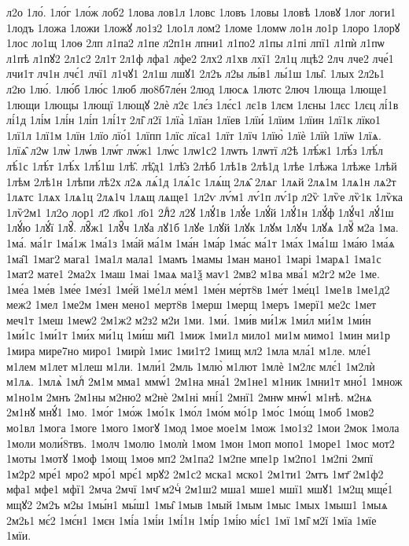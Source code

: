 {л2о
1ло́.
1ло́г
1ло́ж
лоб2
1лова
лов1л
1ловс
1ловъ
1ловы
1ловѣ
1ловꙋ
1лог
логи1
1лодъ
1ложа
1ложи
1ложꙋ
ло1з2
1ло1л
лом2
1ломе
1ломѡ
ло1н
ло1р
1лоро
1лорꙋ
1лос
ло1щ
1лоѳ
2лп
л1па2
л1пе
л2п1н
лпни1
л1по2
л1пы
л1пі
лпї1
л1пѝ
л1пѡ
л1пѣ
л1пꙋ2
2л1с2
2л1т
2л1ф
лфа1
лфе2
2лх2
л1хв
лхї1
2л1ц
лцѣ2
2лч
лче2
лче́1
лчи1т
лч1н
лчє́1
лчї1
л1чꙋ1
2л1ш
лшꙋ1
2л2ъ
л2ы
лы́в1
лы́1ш
1лы̑.
1лых
2л2ь1
л2ю
1лю́.
1лю́б
1лю́с
1люб
лю8б7ле́н
2люд
1люсѧ
1лютс
2люч
1люща
1люще1
1лющи
1лющы
1лющї
1лющꙋ
2лѐ
л2є
1лє́з
1лє́с1
лє1в
1лєм
1лєны
1лєс
1лєц
лі́1в
лі́1д
1лі́м
1лі́н
1лі́п
1лі́1т
2лі̑
л2ї
1лїа̀
1лїан
1лїев
1лїи́
1лїим
1лїин
1лї1к
лїко1
1лї1л
1лї1м
1лїн
1лїо
лїо́1
1лїпп
1лїс
лїса1
1лїт
1лїч
1лїю̀
1лїѐ
1лїѝ
1лїѡ
1лїѧ.
1лїѧ̑
л2ѡ
1лѡ̀
1лѡ́в
1лѡ́г
лѡ́ж1
1лѡ́с
1лѡ1с2
1лѡть
1лѡтї
л2ѣ
1лѣ́ж1
1лѣ́з
1лѣ́л
лѣ́1с
1лѣ́т
1лѣ́х
1лѣ́1ш
1лѣ̑.
лѣ̑д1
1лѣ̑з
2лѣб
1лѣ1в
2лѣ1д
1лѣе
1лѣжа
1лѣже
1лѣй
1лѣм
2лѣ1н
1лѣпи
лѣ2х
л2ѧ
лѧ́1д
1лѧ́1с
1лѧ́щ
2лѧ̑
2лѧг
1лѧй
2лѧ1м
1лѧ1н
лѧ2т
1лѧтс
1лѧх
1лѧ1ц
2лѧ1ч
1лѧщ
лѧще1
1л2ѵ
лѵ́м1
лѵ́1п
лѵ́1р
л2ѷ
1лѷе
лѷ1к
1лѷка
1лѷ2м1
1л2ѻ
лѻр1
л҃2
л҃ко1
л҃о1
2лⷣ2
л2ꙋ
1лꙋ́1в
1лꙋ́е
1лꙋ́й
1лꙋ́1н
1лꙋ́ф
1лꙋ́ч1
лꙋ́1ш
1лꙋ́ю
1лꙋ́ї
1лꙋ̑.
лꙋ̑ж1
1лꙋ̑ч
1лꙋа
лꙋ1б
1лꙋе
1лꙋй
1лꙋк
1лꙋм
1лꙋч
1лꙋѧ
1лꙋⷩ
м2а
1ма.
1ма́.
ма́1г
1ма́1ж
1ма́1з
1ма́й
ма́1м
1ма́н
1ма́р
1ма́с
ма́1т
1ма́х
1ма́1ш
1ма́ю
1ма́ѧ
1ма̑1
1маг2
мага1
1ма1л
мала1
1мамъ
1мамы
1ман
мано1
1марі
1марѧ1
1ма1с
1мат2
мате1
2ма2х
1маш
1маі
1маѧ
ма1ѯ
маѵ1
2мв2
м1ва
мва́1
м2г2
м2е
1ме.
1ме́а
1ме́в
1ме́е
1ме́з1
1ме́й
1ме́1л
ме́м1
1ме́н
ме́рт8в
1ме́т
1ме́ц1
1ме1в
1ме1д2
меж2
1мел
1ме2м
1мен
мено1
мерт8в
1мерш
1мерщ
1меръ
1мерї1
ме2с
1мет
меч1т
1меш
1меѡ2
2м1ж2
м2з2
м2и
1ми.
1ми́.
1ми́в
ми́1ж
1ми́л
ми́1м
1ми́н
1ми́1с
1ми́1т
1ми́х
ми́1ц
1ми́ш
ми̑1
1миж
1ми1л
мило1
ми1м
мимо1
1мин
ми1р
1мира
мире7но
миро1
1мирѝ
1мис
1ми1т2
1мищ
мл2
1мла
мла́1
м1ле.
мле́1
м1лем
м1лет
м1леш
м1ли.
1мли́1
2мль
1млю̀
м1лют
1млѐ
1м2лє
млє́1
1м2лѝ
м1лѧ.
1млѧ̀
1млⷭ
2м1м
мма1
ммѡ́1
2м1на
мна́1
2м1не1
м1ник
1мни1т
мно́1
1множ
м1но1м
2мнъ
2м1ны
м2ню2
м2нѐ
2м1ні
мні́1
2мнї1
2мнѡ
мнѡ́1
м1нѣ.
м2нѧ
2м1нꙋ
мнꙋ́1
1мо.
1мо́г
1мо́ж
1мо́1к
1мо́л
1мо́м
мо́1р
1мо́с
1мо́щ
1моб
1мов2
мо1вл
1мога
1моге
1мого
1могꙋ
1мод
1мое
мое1м
1мож
1мо1з2
1мои
2мок
1мола
1моли
моли́8твъ.
1молч
1молю
1молѝ
1мом
1мон
1моп
мопо1
1море1
1мос
мот2
1моты
1мотꙋ
1моф
1мощ
1моѳ
мп2
2м1па2
1м2пе
мпе1р
1м2по1
1м2пі
2мпї
1м2р2
мре́1
мро2
мро́1
мрє́1
мрꙋ2
2м1с2
мска1
мско1
2м1ти1
2мтъ
1мт҃
2м1ф2
мфа1
мфе1
мфї1
2мча
2мчї
1мч҃
м2чⷭ
2м1ш2
мша1
мше1
мшї1
мшꙋ1
1м2щ
мще́1
мщꙋ2
2м2ъ
м2ы
1мы́н1
мы́ш1
1мы̑
1мыв
1мый
1мым
1мыс
1мых
1мыш1
1мыѧ
2м2ь1
мє́2
1мє́н1
1мєн
1мі́а
1мі́и
1мі́1н
1мі́р
1мі́ю
мі́є1
1мї
1мі̑
м2ї
1мїа
1мїе
1мїи.
}
